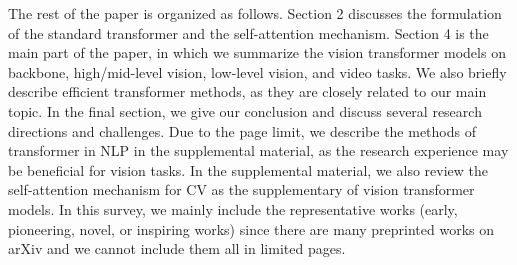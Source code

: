The rest of the paper is organized as follows. Section 2 discusses the formulation of the standard transformer and the self-attention mechanism. Section 4 is the main part of the paper, in which we summarize the vision transformer models on backbone, high/mid-level vision, low-level vision, and video tasks. We also briefly describe efficient transformer methods, as they are closely related to our main topic. In the final section, we give our conclusion and discuss several research directions and challenges. Due to the page limit, we describe the methods of transformer in NLP in the supplemental material, as the research experience may be beneficial for vision tasks. In the supplemental material, we also review the self-attention mechanism for CV as the supplementary of vision transformer models. In this survey, we mainly include the representative works (early, pioneering, novel, or inspiring works) since there are many preprinted works on arXiv and we cannot include them all in limited pages.
